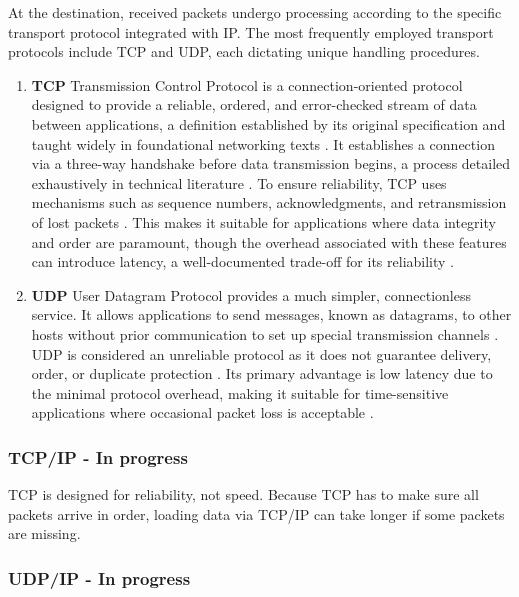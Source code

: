 At the destination, received packets undergo processing according to the specific transport protocol integrated with IP. The most frequently employed transport protocols include TCP and UDP, each dictating unique handling procedures.

\begin{enumerate}
    \item \textbf{TCP} Transmission Control Protocol is a connection-oriented protocol designed to provide a reliable, ordered, and error-checked stream of data between applications, a definition established by its original specification \cite{rfc793} and taught widely in foundational networking texts \cite{kurose2021}. It establishes a connection via a three-way handshake before data transmission begins, a process detailed exhaustively in technical literature \cite{stevens1994}. To ensure reliability, TCP uses mechanisms such as sequence numbers, acknowledgments, and retransmission of lost packets \cite{rfc793}. This makes it suitable for applications where data integrity and order are paramount, though the overhead associated with these features can introduce latency, a well-documented trade-off for its reliability \cite{kurose2021, stevens1994}.
    \item \textbf{UDP} User Datagram Protocol provides a much simpler, connectionless service. It allows applications to send messages, known as datagrams, to other hosts without prior communication to set up special transmission channels \cite{rfc768}. UDP is considered an unreliable protocol as it does not guarantee delivery, order, or duplicate protection \cite{kurose2021}. Its primary advantage is low latency due to the minimal protocol overhead, making it suitable for time-sensitive applications where occasional packet loss is acceptable \cite{forouzan2010}. 

\end{enumerate}


\subsubsection{TCP/IP - In progress}
\label{sub:TCP_IP}

TCP is designed for reliability, not speed. Because TCP has to make sure all packets arrive in order, loading data via TCP/IP can take longer if some packets are missing.

\subsubsection{UDP/IP - In progress}
\label{sub:UDP_IP}

